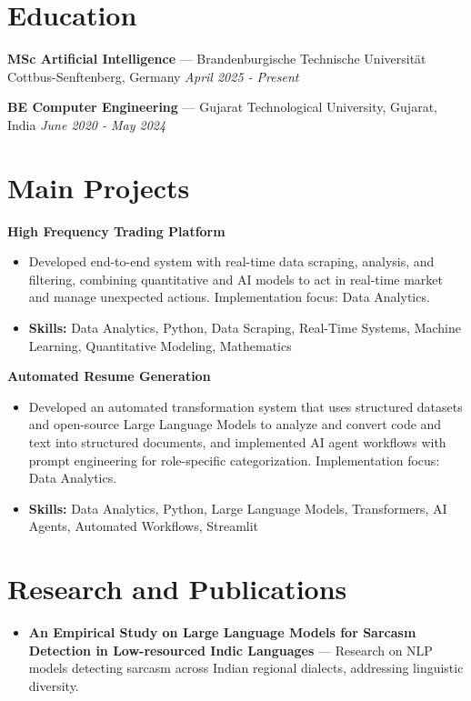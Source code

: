 \documentclass[a4paper,10pt]{article}
\begin{document}
\section*{Education}
\textbf{MSc Artificial Intelligence} — Brandenburgische Technische Universität Cottbus-Senftenberg, Germany \hfill \textit{April 2025 - Present}\par
\vspace{1.5pt}
\textbf{BE Computer Engineering} — Gujarat Technological University, Gujarat, India \hfill \textit{June 2020 - May 2024}\par

\section*{Main Projects}
\textbf{High Frequency Trading Platform}\par
\vspace{1pt}
\begin{itemize}
  \item Developed end-to-end system with real-time data scraping, analysis, and filtering, combining quantitative and AI models to act in real-time market and manage unexpected actions. Implementation focus: Data Analytics.
  \item \textbf{Skills:} Data Analytics, Python, Data Scraping, Real-Time Systems, Machine Learning, Quantitative Modeling, Mathematics
\end{itemize}
\vspace{3pt}
\textbf{Automated Resume Generation}\par
\vspace{1pt}
\begin{itemize}
  \item Developed an automated transformation system that uses structured datasets and open-source Large Language Models to analyze and convert code and text into structured documents, and implemented AI agent workflows with prompt engineering for role-specific categorization. Implementation focus: Data Analytics.
  \item \textbf{Skills:} Data Analytics, Python, Large Language Models, Transformers, AI Agents, Automated Workflows, Streamlit
\end{itemize}

\section*{Research and Publications}
\begin{itemize}
\item \textbf{An Empirical Study on Large Language Models for Sarcasm Detection in Low-resourced Indic Languages} — Research on NLP models detecting sarcasm across Indian regional dialects, addressing linguistic diversity.
\end{itemize}
\end{document}
